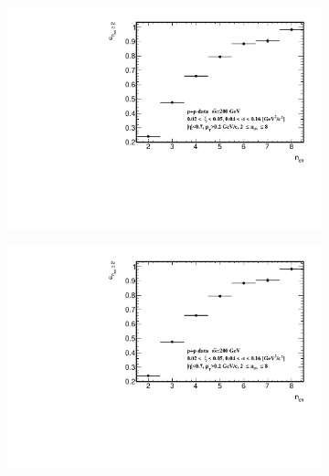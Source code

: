 \begin{figure}[h!]
	\centering
	\vspace{-2.5cm}
	\begin{subfigure}{.49\textwidth}
		\includegraphics[width=\textwidth,page=6]{chapters/chrgSTAR/img/syst/outSD.pdf}
	\end{subfigure}
	\begin{subfigure}{.49\textwidth}
		\includegraphics[width=\textwidth,page=13]{chapters/chrgSTAR/img/syst/outSD.pdf}
	\end{subfigure}
	\begin{subfigure}{.49\textwidth}

\end{subfigure}
\end{figure}
